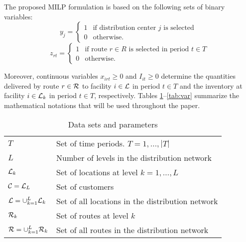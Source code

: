 \documentclass[a4paper,10pt]{article}
\begin{document}
\begin{linenumbers}
The proposed MILP formulation is based on the following sets of binary variables: 
$$	y_j  = \left\{
\begin{array}{ll}
1 & \mbox{if distribution center } j \mbox{ is selected }  \\
0 & \mbox{otherwise.}
\end{array}
\right.
$$
$$	z_{rt}  = \left\{
\begin{array}{ll}
1 & \mbox{if route } r \in R \mbox{ is selected in period } t \in T \\
0 & \mbox{otherwise.}
\end{array}
\right.
$$

Moreover, continuous variables $x_{irt} \geq 0$ and $I_{it} \geq 0$  
determine the quantities delivered by route $r \in \mathcal{R}$ to facility $i \in \mathcal{L}$ in period $t\in T$
and the inventory at facility $i \in \mathcal{L}_{k}$ in period $t \in T$, respectively. 
Tables \ref{tab:set}--\ref{tab:var} summarize the mathematical notations that will be used throughout the paper.

\begin{table}[htbp]
	\centering
	\begin{tabular}{ll}
		\toprule
		$T$ & Set of time periods. $T = 1,\dots,|T|$\\
		$L$ & Number of levels in the distribution network\\
		$\mathcal{L}_k$ & Set of locations at level $k=1, \ldots,L$ \\
		$\mathcal{C}=\mathcal{L}_L$ & Set of customers \\ 
		$\mathcal{L}=\cup_{k=1}^L \mathcal{L}_k$ & Set of all locations in the distribution network\\
		$\mathcal{R}_k$ & Set of routes at level $k$\\
		$\mathcal{R} = \cup_{k=1}^{L} \mathcal{R}_k$ & Set of all routes in the distribution network\\
		\bottomrule
	\end{tabular}
	\caption{Data sets and parameters}
	\label{tab:set}
\end{table}       



\end{linenumbers}
\end{document}
